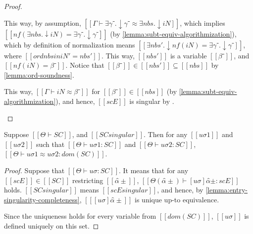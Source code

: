 \begin{proof}
\begin{itemize}
\begin{caseof}
\begin{caseof}
                            This way, by assumption, $[[Γ ⊢ ∃γ⁻.↓γ⁻ ≈ ∃nbs.↓iN]]$, which implies
                            $[[nf(∃nbs.↓iN) = ∃γ⁻.↓γ⁻]]$ (by \cref{lemma:subt-equiv-algorithmization}), 
                            which by definition of normalization means
                            $[[∃nbs'.↓nf(iN) = ∃γ⁻.↓γ⁻]]$, where $[[ord {nbs} in iN' = nbs']]$.
                            This way, $[[nbs']]$ is a variable $[[β⁻]]$, and $[[ nf(iN) = β⁻ ]]$.
                            Notice that $[[β⁻]] \in [[nbs']] \subseteq [[nbs]]$ by \cref{lemma:ord-soundness}.

                            This way, $[[Γ ⊢ iN ≈ β⁻]]$ for $[[β⁻]] \in [[nbs]]$ (by \cref{lemma:subt-equiv-algorithmization}),
                            and hence, $[[scE]]$ is singular by .
                    \end{caseof}
            \end{caseof}
    \end{itemize}
\end{proof}

\begin{lemma}
    \label{lemma:singularity-soundness}
    Suppose $[[Θ ⊢ SC]]$, and $[[SC singular]]$. 
    Then for any $[[uσ1]]$ and $[[uσ2]]$ such that $[[Θ ⊢ uσ1 : SC]]$ and $[[Θ ⊢ uσ2 : SC]]$,
    $[[Θ ⊢ uσ1 ≈ uσ2 : dom(SC)]]$.
\end{lemma}
\begin{proof}
    Suppose that $[[Θ ⊢ uσ : SC]]$.
    It means that for any $[[scE]] \in [[SC]]$ restricting $[[α̂±]]$,
    $[[Θ(α̂±) ⊢ [uσ]α̂± : scE]]$ holds.
    $[[SC singular]]$ means $[[scE singular]]$,
    and hence, by \cref{lemma:entry-singularity-completeness},
    $[[ [uσ]α̂± ]]$ is unique up-to equivalence.

    Since the uniqueness holds for every variable from $[[dom(SC)]]$,
    $[[uσ]]$ is defined uniquely on this set.
\end{proof}

\begin{lemma}
\end{lemma}
